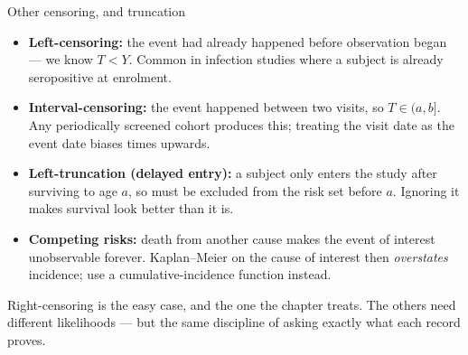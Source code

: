 \documentclass[aspectratio=169,11pt]{beamer}
\begin{document}
\begin{frame}{Other censoring, and truncation}
  \footnotesize
  \begin{readme}
    \begin{itemize}
      \item \textbf{Left-censoring:} the event had already happened before observation
            began --- we know $T<Y$. Common in infection studies where a subject is
            already seropositive at enrolment.
      \item \textbf{Interval-censoring:} the event happened between two visits, so
            $T\in(a,b]$. Any periodically screened cohort produces this; treating the
            visit date as the event date biases times upwards.
      \item \textbf{Left-truncation (delayed entry):} a subject only enters the study
            after surviving to age $a$, so must be excluded from the risk set before $a$.
            Ignoring it makes survival look better than it is.
      \item \textbf{Competing risks:} death from another cause makes the event of interest
            unobservable forever. Kaplan--Meier on the cause of interest then
            \emph{overstates} incidence; use a cumulative-incidence function instead.
    \end{itemize}
  \end{readme}
  \begin{takeaway}
    Right-censoring is the easy case, and the one the chapter treats. The others
    need different likelihoods --- but the same discipline of asking exactly what
    each record proves.
  \end{takeaway}
\end{frame}
\end{document}
